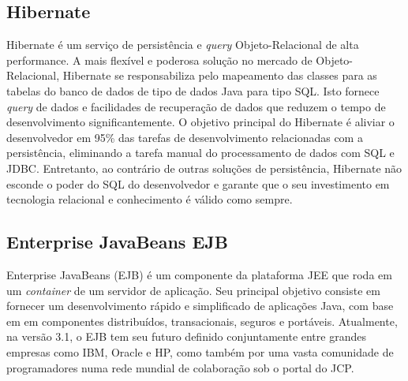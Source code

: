 \documentclass[12pt,a4paper]{article}
\begin{document}
\subsection{Hibernate}

Hibernate é um serviço de persistência e \textit{query} Objeto-Relacional de alta performance. A mais flexível e poderosa solução no mercado de Objeto-Relacional, Hibernate se responsabiliza pelo mapeamento das classes para as tabelas do banco de dados de tipo de dados Java  para tipo SQL. Isto fornece \textit{query} de dados e facilidades de recuperação de dados que reduzem o tempo de desenvolvimento significantemente. O objetivo principal do Hibernate é aliviar o desenvolvedor em 95\% das tarefas de desenvolvimento relacionadas com a persistência, eliminando a tarefa manual do processamento de dados com SQL e JDBC. Entretanto, ao contrário de outras soluções de persistência, Hibernate não esconde o poder do SQL do desenvolvedor e garante que o seu investimento em tecnologia relacional e conhecimento é válido como  sempre.

\subsection{Enterprise JavaBeans EJB}
Enterprise JavaBeans (EJB) é um componente da plataforma JEE que roda em um \textit{container} de um servidor de aplicação. Seu principal objetivo consiste em fornecer um desenvolvimento rápido e simplificado de aplicações Java, com base em em componentes distribuídos, transacionais, seguros e portáveis. Atualmente, na versão 3.1, o EJB tem seu futuro definido conjuntamente entre grandes empresas como IBM, Oracle e HP, como também por uma vasta comunidade de programadores numa rede mundial de colaboração sob o portal do JCP.
\end{document}
